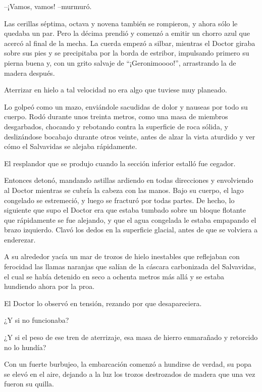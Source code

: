 --¡Vamos, vamos! --murmuró.
 
Las cerillas séptima, octava y novena también se rompieron, y ahora sólo le quedaba un par. Pero la décima prendió y comenzó a emitir un chorro azul que acercó al final de la mecha. La cuerda empezó a silbar, mientras el Doctor giraba sobre sus pies y se precipitaba por la borda de estribor, impulsando primero su pierna buena y, con un grito salvaje de ``¡Geronimoooo!'', arrastrando la de madera después.
 
Aterrizar en hielo a tal velocidad no era algo que tuviese muy planeado.
 
Lo golpeó como un mazo, enviándole sacudidas de dolor y nauseas por todo su cuerpo. Rodó durante unos treinta metros, como una masa de miembros desgarbados, chocando y rebotando contra la superficie de roca sólida, y deslizándose bocabajo durante otros veinte, antes de alzar la vista aturdido y ver cómo el Salvavidas se alejaba rápidamente.
 
El resplandor que se produjo cuando la sección inferior estalló fue cegador.
 
Entonces detonó, mandando astillas ardiendo en todas direcciones y envolviendo al Doctor mientras se cubría la cabeza con las manos. Bajo su cuerpo, el lago congelado se estremeció, y luego se fracturó por todas partes. De hecho, lo siguiente que supo el Doctor era que estaba tumbado sobre un bloque flotante que rápidamente se fue alejando, y que el agua congelada le estaba empapando el brazo izquierdo. Clavó los dedos en la superficie glacial, antes de que se volviera a enderezar.
 
A su alrededor yacía un mar de trozos de hielo inestables que reflejaban con ferocidad las llamas naranjas que salían de la cáscara carbonizada del Salvavidas, el cual se había detenido en seco a ochenta metros más allá y se estaba hundiendo ahora por la proa.
 
El Doctor lo observó en tensión, rezando por que desapareciera.
 
¿Y si no funcionaba?
 
¿Y si el peso de ese tren de aterrizaje, esa masa de hierro enmarañado y retorcido no lo hundía?
 
Con un fuerte burbujeo, la embarcación comenzó a hundirse de verdad, su popa se elevó en el aire, dejando a la luz los trozos destrozados de madera que una vez fueron su quilla.
 
